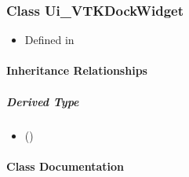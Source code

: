 \documentclass[letterpaper,10pt,english]{sphinxmanual}
\begin{document}
\sphinxstepscope


\subsubsection{Class Ui\_VTKDockWidget}
\label{\detokenize{api/classUi__VTKDockWidget:class-ui-vtkdockwidget}}\label{\detokenize{api/classUi__VTKDockWidget:exhale-class-classui-vtkdockwidget}}\label{\detokenize{api/classUi__VTKDockWidget::doc}}\begin{itemize}
\item {} 
\sphinxAtStartPar
Defined in 

\end{itemize}


\paragraph{Inheritance Relationships}
\label{\detokenize{api/classUi__VTKDockWidget:inheritance-relationships}}

\subparagraph{Derived Type}
\label{\detokenize{api/classUi__VTKDockWidget:derived-type}}\begin{itemize}
\item {} 
\sphinxAtStartPar
{} ({\hyperref[\detokenize{api/classUi_1_1VTKDockWidget:exhale-class-classui-1-1vtkdockwidget}]{}})

\end{itemize}


\paragraph{Class Documentation}
\label{\detokenize{api/classUi__VTKDockWidget:class-documentation}}
\end{document}
